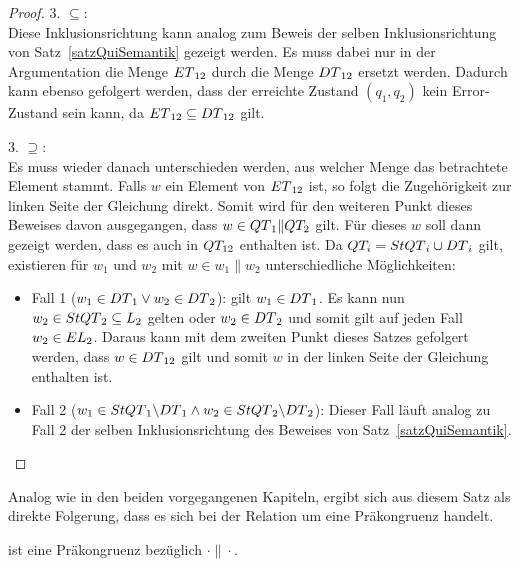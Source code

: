 \begin{proof}
  3. \glqq{}$\subseteq$\grqq{}:\\
  Diese Inklusionsrichtung kann analog zum Beweis der selben Inklusionsrichtung
  von Satz~\ref{satzQuiSemantik} gezeigt werden. Es muss dabei nur in der
  Argumentation die Menge $ET{}_{12}$ durch die Menge $DT{}_{12}$ ersetzt
  werden. Dadurch kann ebenso gefolgert werden, dass der erreichte Zustand
  $(q_1,q_2)$ kein Error-Zustand sein kann, da $ET{}_{12}\subseteq DT{}_{12}$
  gilt.

  3. \glqq{}$\supseteq$\grqq{}:\\
  Es muss wieder danach unterschieden werden, aus welcher Menge das betrachtete
  Element stammt. Falls $w$ ein Element von $ET{}_{12}$ ist, so folgt die
  Zugehörigkeit zur linken Seite der Gleichung direkt. Somit wird für den
  weiteren Punkt dieses Beweises davon ausgegangen, dass $w\in QT{}_1\|QT_2$
  gilt. Für dieses $w$ soll dann gezeigt werden, dass es auch in $QT_{12}$
  enthalten ist. Da $QT_i=StQT{}_i\cup DT{}_i$ gilt, existieren für $w_1$
  und $w_2$ mit $w\in w_1\|w_2$ unterschiedliche Möglichkeiten:
  \begin{itemize}
    \item Fall 1 ($w_1\in DT{}_1 \vee w_2\in DT{}_2$): \OBdA{} gilt $w_1\in
      DT{}_1$. Es kann nun $w_2\in StQT{}_2 \subseteq L_2$ gelten oder
      $w_2\in DT{}_2$ und somit gilt auf jeden Fall $w_2\in EL{}_2$. Daraus
      kann mit dem zweiten Punkt dieses Satzes gefolgert werden, dass $w\in
      DT{}_{12}$ gilt und somit $w$ in der linken Seite der Gleichung
      enthalten ist.
    \item Fall 2 ($w_1\in StQT{}_1\backslash DT{}_1 \wedge w_2\in StQT{}_2
      \backslash DT{}_2$): Dieser Fall läuft analog zu Fall 2 der selben
      Inklusionsrichtung des Beweises von Satz~\ref{satzQuiSemantik}.
  \end{itemize}
\end{proof}

Analog wie in den beiden vorgegangenen Kapiteln, ergibt sich aus diesem Satz
als direkte Folgerung, dass es sich bei der Relation \DRel{} um eine
Präkongruenz handelt.

\begin{prop}
\label{propDivPrae}
  \DRel{} ist eine Präkongruenz bezüglich $\cdot\|\cdot$.
\end{prop}

